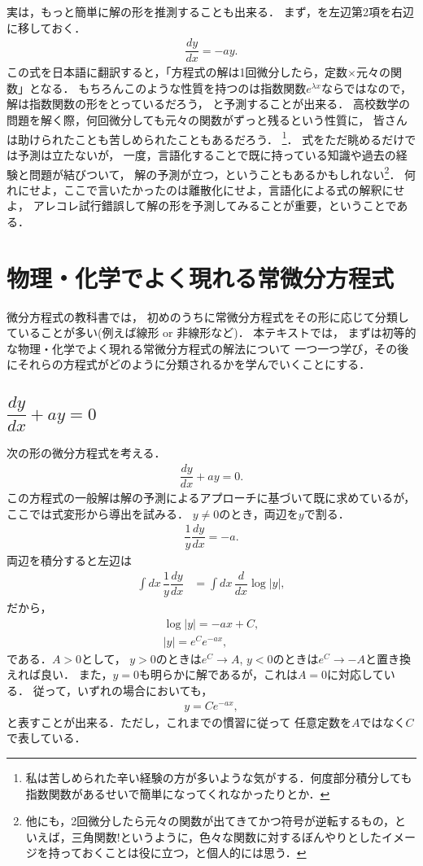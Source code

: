 実は，もっと簡単に解の形を推測することも出来る．
まず，を左辺第2項を右辺に移しておく．
\begin{align}
 \dfrac{dy}{dx} = -ay.
\end{align}
この式を日本語に翻訳すると，「方程式の解は1回微分したら，定数$\times$元々の関数」となる．
もちろんこのような性質を持つのは指数関数$e^{\lambda x}$ならではなので，解は指数関数の形をとっているだろう，
と予測することが出来る．
高校数学の問題を解く際，何回微分しても元々の関数がずっと残るという性質に，
皆さんは助けられたことも苦しめられたこともあるだろう．
\footnote{私は苦しめられた辛い経験の方が多いような気がする．何度部分積分しても指数関数があるせいで簡単になってくれなかったりとか．}．
式をただ眺めるだけでは予測は立たないが，
一度，言語化することで既に持っている知識や過去の経験と問題が結びついて，
解の予測が立つ，ということもあるかもしれない\footnote{他にも，2回微分したら元々の関数が出てきてかつ符号が逆転するもの，といえば，三角関数!というように，色々な関数に対するぼんやりとしたイメージを持っておくことは役に立つ，と個人的には思う．}．
何れにせよ，ここで言いたかったのは離散化にせよ，言語化による式の解釈にせよ，
アレコレ試行錯誤して解の形を予測してみることが重要，ということである．
%
\section{物理・化学でよく現れる常微分方程式}
%
微分方程式の教科書では，
初めのうちに常微分方程式をその形に応じて分類していることが多い(例えば線形 or 非線形など)．
本テキストでは，
まずは初等的な物理・化学でよく現れる常微分方程式の解法について
一つ一つ学び，その後にそれらの方程式がどのように分類されるかを学んでいくことにする．

\subsection{$\dfrac{dy}{dx} + a y = 0$\label{sec:PDE_02}}
%
次の形の微分方程式を考える．
\begin{align}
 \dfrac{dy}{dx} + a y = 0. \label{eq:PDE_02} 
\end{align}
この方程式の一般解は解の予測によるアプローチに基づいて既に求めているが，ここでは式変形から導出を試みる．
$y\neq 0$のとき，両辺を$y$で割る．
\begin{align}
\dfrac{1}{y}\dfrac{dy}{dx} = -a. 
\end{align}
両辺を積分すると左辺は
\begin{align}
 \int dx\,\dfrac{1}{y}\dfrac{dy}{dx} 
 & = \int dx\,\dfrac{d}{dx}\log \left|y\right|, 
\end{align}
だから，
\begin{align}
\log \left| y \right| = -ax + C,\\
\left| y \right| = e^{C} e^{-ax}, 
\end{align}
である．$A>0$として，
$y> 0 $のときは$e^C \to A$, $y < 0$のときは$e^{C} \to -A$と置き換えれば良い．
また，$y=0$も明らかに解であるが，これは$A=0$に対応している．
従って，いずれの場合においても，
\begin{align}
 y = C e^{-ax}, 
\end{align}
と表すことが出来る．ただし，これまでの慣習に従って
任意定数を$A$ではなく$C$で表している．
 
